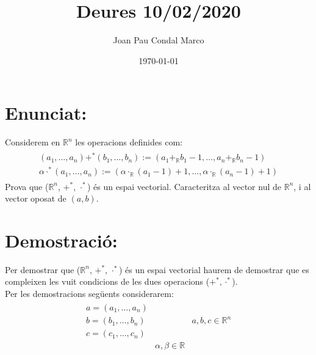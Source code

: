\documentclass[a4paper, 9pt]{article}
\title{Deures 10/02/2020}
\author{Joan Pau Condal Marco}
\date{\today}
\begin{document}
    \maketitle
    \justify
    \section*{Enunciat:}

    Considerem en ${\mathbb{R}^n}$ les operacions definides com:
    \begin{align*}
        \begin{aligned}
            (a_1, \dots , a_n) +^* (b_1, \dots , b_n) := (a_1 +_{\mathbb{R}} b_1 - 1, \dots , a_n +_{\mathbb{R}} b_n -1) \\
            \alpha \cdot^* (a_1, \dots , a_n) := (\alpha \cdot_{\mathbb{R}} (a_1 -1)+1, \dots , \alpha \cdot_{\mathbb{R}} (a_n -1)+1)
        \end{aligned}
    \end{align*}
    Prova que (${\mathbb{R}}^n$, ${+^*}$, ${\cdot^*}$) \'es un espai vectorial. Caracteritza al vector nul de ${\mathbb{R}^n}$, i al vector oposat de ${(a,b)}$.  \\

    \section*{Demostraci\'o:}
    Per demostrar que (${\mathbb{R}}^n$, ${+^*}$, ${\cdot^*}$) \'es un espai vectorial haurem de demostrar que es compleixen les vuit condicions de les dues operacions (${+^*, \cdot^*}$).\\
    Per les demostracions seg\"uents considerarem:
    \begin{align*}
        \begin{array}{lcl}
            a = (a_1,\dots,a_n)& & \\
            b = (b_1,\dots,b_n)& & a, b, c \in \mathbb{R}^n\\
            c = (c_1,\dots,c_n)& &\\
            & \alpha,\beta \in \mathbb{R} &
        \end{array}
    \end{align*}
    
\end{document}
